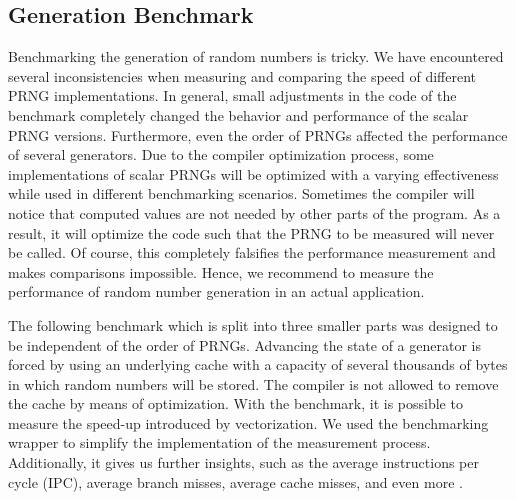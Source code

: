 \documentclass{stdlocal}
\begin{document}
  \subsection{Generation Benchmark} %
  \label{sub:generation_benchmark}
    Benchmarking the generation of random numbers is tricky.
    We have encountered several inconsistencies when measuring and comparing the speed of different PRNG implementations.
    In general, small adjustments in the code of the benchmark completely changed the behavior and performance of the scalar PRNG versions.
    Furthermore, even the order of PRNGs affected the performance of several generators.
    Due to the compiler optimization process, some implementations of scalar PRNGs will be optimized with a varying effectiveness while used in different benchmarking scenarios.
    Sometimes the compiler will notice that computed values are not needed by other parts of the program.
    As a result, it will optimize the code such that the PRNG to be measured will never be called.
    Of course, this completely falsifies the performance measurement and makes comparisons impossible.
    Hence, we recommend to measure the performance of random number generation in an actual application.

    The following benchmark which is split into three smaller parts was designed to be independent of the order of PRNGs.
    Advancing the state of a generator is forced by using an underlying cache with a capacity of several thousands of bytes in which random numbers will be stored.
    The compiler is not allowed to remove the cache by means of optimization.
    With the benchmark, it is possible to measure the speed-up introduced by vectorization.
    We used the  benchmarking wrapper to simplify the implementation of the measurement process.
    Additionally, it gives us further insights, such as the average instructions per cycle (IPC), average branch misses, average cache misses, and even more \autocite{perfevent}.
\end{document}
